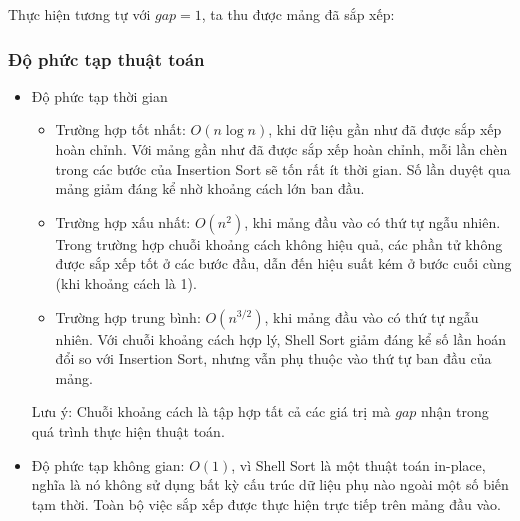 Thực hiện tương tự với $gap = 1$, ta thu được mảng đã sắp xếp:

\begin{center}
\end{center}

\subsubsection{Độ phức tạp thuật toán}

\begin{itemize}
    \item Độ phức tạp thời gian
    \begin{itemize}[label=$\circ$]
        \item Trường hợp tốt nhất: $O\left(n\log{n}\right)$, khi dữ liệu 
        gần như đã được sắp xếp hoàn chỉnh. Với mảng gần như đã được sắp 
        xếp hoàn chỉnh, mỗi lần chèn trong các bước của Insertion Sort sẽ 
        tốn rất ít thời gian. Số lần duyệt qua mảng giảm đáng kể nhờ khoảng 
        cách lớn ban đầu.
        \item Trường hợp xấu nhất: $O\left(n^2\right)$, khi mảng đầu vào 
        có thứ tự ngẫu nhiên. Trong trường hợp chuỗi khoảng cách không 
        hiệu quả, các phần tử không được sắp xếp tốt ở các bước đầu, dẫn 
        đến hiệu suất kém ở bước cuối cùng (khi khoảng cách là 1).
        \item Trường hợp trung bình: $O\left(n^{3/2}\right)$, khi mảng đầu 
        vào có thứ tự ngẫu nhiên. Với chuỗi khoảng cách hợp lý, Shell Sort 
        giảm đáng kể số lần hoán đổi so với Insertion Sort, nhưng vẫn phụ 
        thuộc vào thứ tự ban đầu của mảng.
    \end{itemize}
    Lưu ý: Chuỗi khoảng cách là tập hợp tất cả các giá trị mà $gap$ nhận 
    trong quá trình thực hiện thuật toán.
    
    \item Độ phức tạp không gian: $O\left(1\right)$, vì Shell Sort là một 
    thuật toán in-place, nghĩa là nó không sử dụng bất kỳ cấu trúc dữ liệu 
    phụ nào ngoài một số biến tạm thời. Toàn bộ việc sắp xếp được thực hiện 
    trực tiếp trên mảng đầu vào. 
\end{itemize}